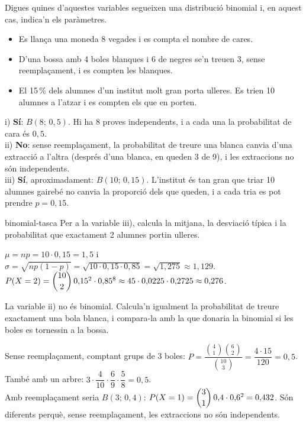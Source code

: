 \begin{apartats}

Digues quines d'aquestes variables segueixen una distribució binomial i, en aquest cas, indica'n els
paràmetres.
\begin{itemize}
\item[i)] Es llança una moneda 8 vegades i es compta el nombre de cares.
\item[ii)] D'una bossa amb 4 boles blanques i 6 de negres se'n treuen 3, sense reemplaçament, i es
compten les blanques.
\item[iii)] El 15\,\% dels alumnes d'un institut molt gran porta ulleres. Es trien 10 alumnes a l'atzar i
es compten els que en porten.
\end{itemize}

\begin{solucio}
i) \textbf{Sí}: $B(8;\,0{,}5)$. Hi ha 8 proves independents, i a cada una la probabilitat de cara és
$0{,}5$.\\
ii) \textbf{No}: sense reemplaçament, la probabilitat de treure una blanca canvia d'una extracció a
l'altra (després d'una blanca, en queden 3 de 9), i les extraccions no són independents.\\
iii) \textbf{Sí}, aproximadament: $B(10;\,0{,}15)$. L'institut és tan gran que triar 10 alumnes gairebé
no canvia la proporció dels que queden, i a cada tria es pot prendre $p=0{,}15$.
\end{solucio}

\begin{tria}{binomial-tasca}
Per a la variable iii), calcula la mitjana, la desviació típica i la probabilitat que exactament 2 alumnes
portin ulleres.

\begin{solucio}
$\mu=np=10\cdot0{,}15=1{,}5$ i $\sigma=\sqrt{np(1-p)}=\sqrt{10\cdot0{,}15\cdot0{,}85}=\sqrt{1{,}275}\approx1{,}129$.\\
$P(X=2)=\dbinom{10}{2}\,0{,}15^2\cdot0{,}85^8\approx45\cdot0{,}0225\cdot0{,}2725\approx0{,}276$.
\end{solucio}

La variable ii) no és binomial. Calcula'n igualment la probabilitat de treure exactament una bola blanca,
i compara-la amb la que donaria la binomial si les boles es tornessin a la bossa.

\begin{solucio}
Sense reemplaçament, comptant grups de 3 boles:
$P=\dfrac{\binom41\binom62}{\binom{10}3}=\dfrac{4\cdot15}{120}=0{,}5$. També amb un arbre:
$3\cdot\dfrac4{10}\cdot\dfrac69\cdot\dfrac58=0{,}5$.\\
Amb reemplaçament seria $B(3;\,0{,}4)$: $P(X=1)=\dbinom31\,0{,}4\cdot0{,}6^2=0{,}432$. Són diferents perquè,
sense reemplaçament, les extraccions no són independents.
\end{solucio}
\end{tria}


\end{apartats}
